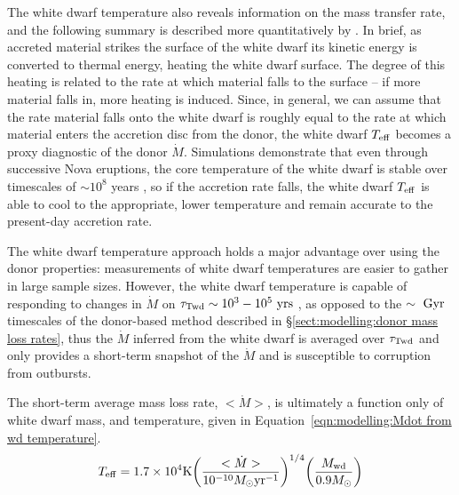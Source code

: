 The white dwarf temperature also reveals information on the mass transfer rate, and the following summary is described more quantitatively by \citet{townsley2009}.
In brief, as accreted material strikes the surface of the white dwarf its kinetic energy is converted to thermal energy, heating the white dwarf surface.
The degree of this heating is related to the rate at which material falls to the surface -- if more material falls in, more heating is induced.
Since, in general, we can assume that the rate material falls onto the white dwarf is roughly equal to the rate at which material enters the accretion disc from the donor, the white dwarf $T_{\rm eff}$ becomes a proxy diagnostic of the donor $\dot M$.
Simulations demonstrate that even through successive Nova eruptions, the core temperature of the white dwarf is stable over timescales of $\sim 10^8$ years \citep{epelstain2007}, so if the accretion rate falls, the white dwarf $T_{\rm eff}$ is able to cool to the appropriate, lower temperature and remain accurate to the present-day accretion rate.

The white dwarf temperature approach holds a major advantage over using the donor properties: measurements of white dwarf temperatures are easier to gather in large sample sizes.
However, the white dwarf temperature is capable of responding to changes in $\dot M$ on $\tau_{\rm Twd} \sim 10^3 - 10^5\ {\rm yrs}$ \citep{townsley2009}, as opposed to the $\rm \sim~Gyr$ timescales of the donor-based method described in \S\ref{sect:modelling:donor mass loss rates}, thus the $\dot M$ inferred from the white dwarf is averaged over $\tau_{\rm Twd}$ and only provides a short-term snapshot of the $\dot M$ and is susceptible to corruption from outbursts.

The short-term average mass loss rate, $<\dot M>$, is ultimately a function only of white dwarf mass, and temperature, given in Equation~\ref{eqn:modelling:Mdot from wd temperature}.
\begin{equation}
    \label{eqn:modelling:Mdot from wd temperature}
    T_{\rm eff} = 1.7 \times 10^4 {\rm K} \bigg( \frac{<\dot M>}{10^{-10} M_\odot {\rm yr}^{-1}} \bigg)^{1/4} \bigg( \frac{M_{\rm wd}}{0.9 M_\odot} \bigg)
\end{equation}

